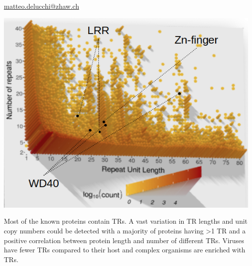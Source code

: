 \documentclass[widescreen,fleqn]{betterposter}
\begin{document}
{{\begin{minipage}[t]{\textwidth}
    \begin{center}
        {\fontsize{35}{35} \selectfont 
            \href{mailto:matteo.delucchi@zhaw.ch}{matteo.delucchi@zhaw.ch}
        }
    \end{center}
\end{minipage}

}

}{
}{

\begin{center}
    \includegraphics[width=0.35\textheight]{figures/fig1_3D_rotated.png}
\end{center}
Most of the known proteins contain TRs. A vast variation in TR lengths and unit copy numbers could be detected with a majority of proteins having >1 TR and a positive correlation between protein length and number of different TRs.
Viruses have fewer TRs compared to their host and complex organisms are enriched with TRs.

}
\end{document}
